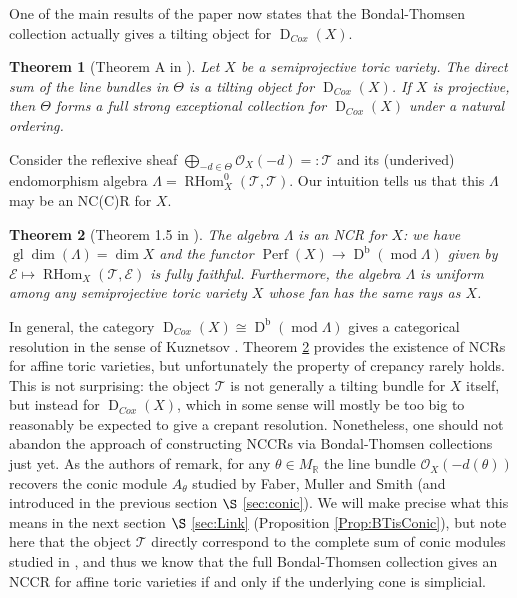 \documentclass[reqno, 12pt]{amsart}
\newtheorem{theorem}{Theorem}[section]
\theoremstyle{definition}
\numberwithin{equation}{section}
\newcommand{\dbmod}[1]{\operatorname{D}^{\operatorname{b}}(\operatorname{mod }#1)}
\newcommand{\R}{\mathbb{R}}
\def\O{\mathcal{O}}
\newcommand{\Rhom}{\operatorname{RHom}}
\newcommand{\gldim}{\operatorname{gl}\dim}
\begin{document}
One of the main results of the paper \cite{BBB+} now states that the Bondal-Thomsen collection actually gives a tilting object for $\operatorname{D}_{Cox}(X)$.
\begin{theorem}[Theorem A in \cite{BBB+}]
    \label{Thm:BTgivesTilting}
    Let $X$ be a semiprojective toric variety. The direct sum of the line bundles in $\Theta$ is a tilting object for $\operatorname{D}_{Cox}(X)$. If $X$ is projective, then $\Theta$ forms a full strong exceptional collection for $\operatorname{D}_{Cox}(X)$ under a natural ordering.
\end{theorem}

 Consider the reflexive sheaf $\bigoplus_{-d\in \Theta}\O_X(-d) =:\mathcal{T}$ and its (underived) endomorphism algebra $\Lambda=\Rhom^0_X(\mathcal{T},\mathcal{T})$. Our intuition tells us that this $\Lambda$ may be an NC(C)R for $X$.
 \begin{theorem}[Theorem 1.5 in \cite{BBB+}]
 \label{Thm:NCRviaBT}
 The algebra $\Lambda$ is an NCR for $X$: we have $\gldim(\Lambda)=\dim X$ and the functor $\operatorname{Perf}(X)\rightarrow \dbmod{\Lambda}$ given by $\mathcal{E}\mapsto \Rhom_X(\mathcal{T},\mathcal{E})$ is fully faithful. Furthermore, the algebra $\Lambda$ is uniform among any semiprojective toric variety $X$ whose fan has the same rays as $X$.
 \end{theorem}

In general, the category $\operatorname{D}_{Cox}(X)\cong \dbmod{\Lambda}$ gives a categorical resolution in the sense of Kuznetsov \cite{Kuz08}. Theorem \ref{Thm:NCRviaBT} provides the existence of NCRs for affine toric varieties, but unfortunately the property of crepancy rarely holds. This is not surprising: the object $\mathcal{T}$ is not generally a tilting bundle for $X$ itself, but instead for $\operatorname{D}_{Cox}(X)$, which in some sense will mostly be too big to reasonably be expected to give a crepant resolution. 
Nonetheless, one should not abandon the approach of constructing NCCRs via Bondal-Thomsen collections just yet. As the authors of \cite{BBB+} remark, for any $\theta\in M_\R$ the line bundle $\O_X(-d(\theta))$ recovers the conic module $A_\theta$ studied by Faber, Muller and Smith (and introduced in the previous section $\S$ \ref{sec:conic}). We will make precise what this means in the next section $\S$ \ref{sec:Link} (Proposition \ref{Prop:BTisConic}), but note here that the object $\mathcal{T}$ directly correspond to the complete sum of conic modules studied in \cite{FMS19}, and thus we know that the full Bondal-Thomsen collection gives an NCCR for affine toric varieties if and only if the underlying cone is simplicial.
\end{document}
